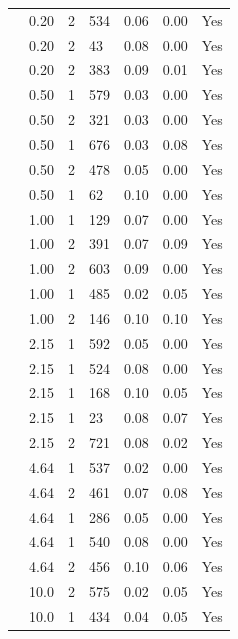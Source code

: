 \begin{longtable}{ | M{2.0cm} | M{2.0cm} | M{1.5cm} | M{1.5cm} | M{2.0cm} | M{2.0cm} | M{1.5cm} | }
                 & 0.20 & 2 & 534 & 0.06 & 0.00 & Yes\\
                 & 0.20 & 2 & 43  & 0.08 & 0.00 & Yes\\
                 & 0.20 & 2 & 383 & 0.09 & 0.01 & Yes\\
                 & 0.50 & 1 & 579 & 0.03 & 0.00 & Yes\\
                 & 0.50 & 2 & 321 & 0.03 & 0.00 & Yes\\
                 & 0.50 & 1 & 676 & 0.03 & 0.08 & Yes\\
                 & 0.50 & 2 & 478 & 0.05 & 0.00 & Yes\\
                 & 0.50 & 1 & 62  & 0.10 & 0.00 & Yes\\
                 & 1.00 & 1 & 129 & 0.07 & 0.00 & Yes\\
                 & 1.00 & 2 & 391 & 0.07 & 0.09 & Yes\\
                 & 1.00 & 2 & 603 & 0.09 & 0.00 & Yes\\
                 & 1.00 & 1 & 485 & 0.02 & 0.05 & Yes\\
                 & 1.00 & 2 & 146 & 0.10 & 0.10 & Yes\\
                 & 2.15 & 1 & 592 & 0.05 & 0.00 & Yes\\
                 & 2.15 & 1 & 524 & 0.08 & 0.00 & Yes\\
                 & 2.15 & 1 & 168 & 0.10 & 0.05 & Yes\\
                 & 2.15 & 1 & 23  & 0.08 & 0.07 & Yes\\
                 & 2.15 & 2 & 721 & 0.08 & 0.02 & Yes\\
                 & 4.64 & 1 & 537 & 0.02 & 0.00 & Yes\\
                 & 4.64 & 2 & 461 & 0.07 & 0.08 & Yes\\
                 & 4.64 & 1 & 286 & 0.05 & 0.00 & Yes\\
                 & 4.64 & 1 & 540 & 0.08 & 0.00 & Yes\\
                 & 4.64 & 2 & 456 & 0.10 & 0.06 & Yes\\
                 & 10.0 & 2 & 575 & 0.02 & 0.05 & Yes\\
                 & 10.0 & 1 & 434 & 0.04 & 0.05 & Yes\\

\end{longtable}
